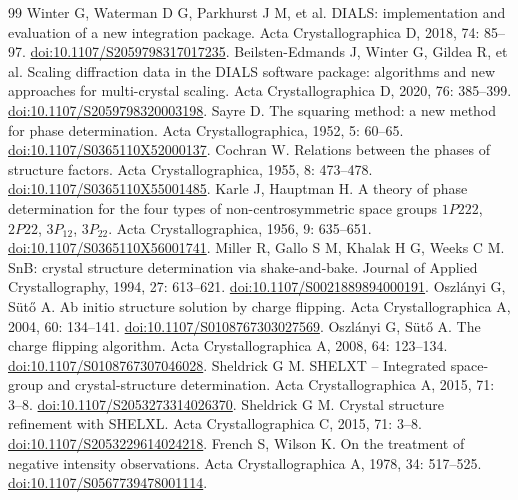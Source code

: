 \begin{thebibliography}{99}
\small\linespread{1.0}\selectfont\setlength{\itemsep}{2pt}\setlength{\parskip}{0pt}
 Winter G, Waterman D G, Parkhurst J M, et al. DIALS: implementation and evaluation of a new integration package. Acta Crystallographica D, 2018, 74: 85--97. \href{https://doi.org/10.1107/S2059798317017235}{doi:10.1107/S2059798317017235}.
 Beilsten-Edmands J, Winter G, Gildea R, et al. Scaling diffraction data in the DIALS software package: algorithms and new approaches for multi-crystal scaling. Acta Crystallographica D, 2020, 76: 385--399. \href{https://doi.org/10.1107/S2059798320003198}{doi:10.1107/S2059798320003198}.
 Sayre D. The squaring method: a new method for phase determination. Acta Crystallographica, 1952, 5: 60--65. \href{https://doi.org/10.1107/S0365110X52000137}{doi:10.1107/S0365110X52000137}.
 Cochran W. Relations between the phases of structure factors. Acta Crystallographica, 1955, 8: 473--478. \href{https://doi.org/10.1107/S0365110X55001485}{doi:10.1107/S0365110X55001485}.
 Karle J, Hauptman H. A theory of phase determination for the four types of non-centrosymmetric space groups $1P222$, $2P22$, $3P_12$, $3P_22$. Acta Crystallographica, 1956, 9: 635--651. \href{https://doi.org/10.1107/S0365110X56001741}{doi:10.1107/S0365110X56001741}.
 Miller R, Gallo S M, Khalak H G, Weeks C M. SnB: crystal structure determination via shake-and-bake. Journal of Applied Crystallography, 1994, 27: 613--621. \href{https://doi.org/10.1107/S0021889894000191}{doi:10.1107/S0021889894000191}.
 Oszlányi G, {\latintext Sütő} A. Ab initio structure solution by charge flipping. Acta Crystallographica A, 2004, 60: 134--141. \href{https://doi.org/10.1107/S0108767303027569}{doi:10.1107/S0108767303027569}.
 Oszlányi G, {\latintext Sütő} A. The charge flipping algorithm. Acta Crystallographica A, 2008, 64: 123--134. \href{https://doi.org/10.1107/S0108767307046028}{doi:10.1107/S0108767307046028}.
 Sheldrick G M. SHELXT -- Integrated space-group and crystal-structure determination. Acta Crystallographica A, 2015, 71: 3--8. \href{https://doi.org/10.1107/S2053273314026370}{doi:10.1107/S2053273314026370}.
 Sheldrick G M. Crystal structure refinement with SHELXL. Acta Crystallographica C, 2015, 71: 3--8. \href{https://doi.org/10.1107/S2053229614024218}{doi:10.1107/S2053229614024218}.
 French S, Wilson K. On the treatment of negative intensity observations. Acta Crystallographica A, 1978, 34: 517--525. \href{https://doi.org/10.1107/S0567739478001114}{doi:10.1107/S0567739478001114}.

\end{thebibliography}

